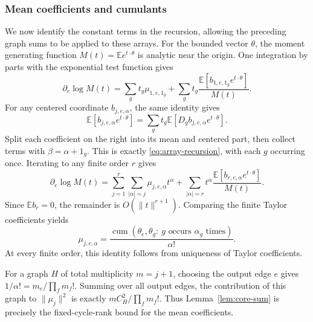 \documentclass[11pt,reqno]{amsart}
\numberwithin{equation}{section}
\theoremstyle{definition}
\theoremstyle{remark}
\theoremstyle{definition}
\DeclareMathOperator{\cum}{cum}
\begin{document}
\subsubsection{Mean coefficients and cumulants}
We now identify the constant terms in the recursion, allowing the preceding graph sums to be applied to these arrays.
For the bounded vector $\theta$, the moment generating function $M(t)=\mathbb E e^{t\cdot\theta}$ is analytic near the origin.
One integration by parts with the exponential test function gives
\[
 \partial_e\log M(t)
 =\sum_g t_g\mu_{1,e,1_g}
  +\sum_g t_g\frac{\mathbb E[b_{1,e,1_g}e^{t\cdot\theta}]}{M(t)}.
\]
For any centered coordinate $b_{j,e,\alpha}$, the same identity gives
\[
 \mathbb E[b_{j,e,\alpha}e^{t\cdot\theta}]
 =\sum_g t_g\mathbb E[D_gb_{j,e,\alpha}e^{t\cdot\theta}].
\]
Split each coefficient on the right into its mean and centered part, then collect terms with $\beta=\alpha+1_g$.
This is exactly \eqref{eq:array-recursion}, with each $g$ occurring once.
Iterating to any finite order $r$ gives
\[
 \partial_e\log M(t)
 =\sum_{j=1}^r\sum_{|\alpha|=j}\mu_{j,e,\alpha}t^\alpha
  +\sum_{|\alpha|=r}t^\alpha
       \frac{\mathbb E[b_{r,e,\alpha}e^{t\cdot\theta}]}{M(t)}.
\]
Since $\mathbb Eb_r=0$, the remainder is $O(\|t\|^{r+1})$.
Comparing the finite Taylor coefficients yields
\begin{equation}\label{eq:mu-cumulant}
 \mu_{j,e,\alpha}
 =\frac{\cum(\theta_e,\theta_g:\ g\text{ occurs }\alpha_g\text{ times})}{\alpha!}.
\end{equation}
At every finite order, this identity follows from uniqueness of Taylor coefficients.

For a graph $H$ of total multiplicity $m=j+1$, choosing the output edge $e$ gives
$1/\alpha!=m_e/\prod_fm_f!$. Summing over all output edges,
the contribution of this graph to $\|\mu_j\|^2$ is exactly
$mC_H^2/\prod_fm_f!$.
Thus Lemma~\ref{lem:core-sum} is precisely the fixed-cycle-rank bound for the mean coefficients.
\end{document}
